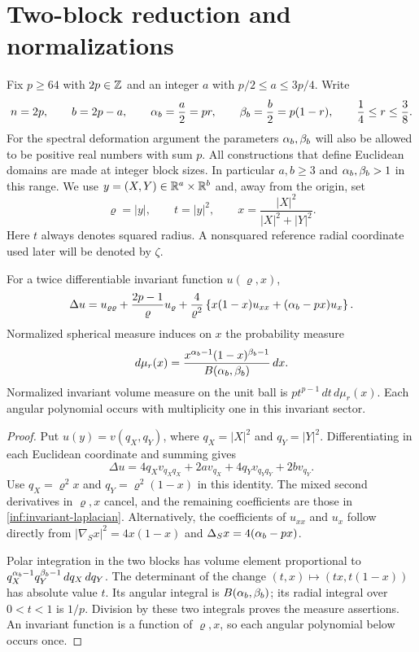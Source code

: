 \section{Two-block reduction and normalizations}\label{inf:sec-reduction}

Fix $p\ge64$ with $2p\in\mathbb{Z}$ and an integer $a$ with
$p/2\le a\le3p/4$. Write
\begin{equation}\label{inf:block-parameters}
 n=2p,\qquad b=2p-a,\qquad
 \alpha_b=\frac a2=pr,\qquad \beta_b=\frac b2=p(1-r),
 \qquad \frac14\le r\le\frac38.
\end{equation}
For the spectral deformation argument the parameters $\alpha_b,\beta_b$ will also
be allowed to be positive real numbers with sum $p$. All constructions
that define Euclidean domains are made at integer block sizes.
In particular $a,b\ge3$ and $\alpha_b,\beta_b>1$ in this range.
We use $y=(X,Y)\in\mathbb{R}^a\times\mathbb{R}^b$ and, away from the origin, set
\begin{equation}\label{inf:coordinates}
 \varrho=|y|,\qquad t=|y|^2,\qquad
 x=\frac{|X|^2}{|X|^2+|Y|^2}.
\end{equation}
Here $t$ always denotes squared radius. A nonsquared reference radial
coordinate used later will be denoted by $\zeta$.

\begin{lemma}\label{inf:reduction}
For a twice differentiable invariant function $u(\varrho,x)$,
\begin{equation}\label{inf:invariant-laplacian}
 \Delta u=u_{\varrho\varrho}+\frac{2p-1}{\varrho}u_\varrho
 +\frac4{\varrho^2}\left\{x(1-x)u_{xx}+(\alpha_b-px)u_x\right\}.
\end{equation}
Normalized spherical measure induces on $x$ the probability measure
\begin{equation}\label{inf:beta-measure}
 d\mu_r(x)=\frac{x^{\alpha_b-1}(1-x)^{\beta_b-1}}{B(\alpha_b,\beta_b)}\,dx.
\end{equation}
Normalized invariant volume measure on the unit ball is
$p t^{p-1}\,dt\,d\mu_r(x)$. Each angular polynomial occurs with
multiplicity one in this invariant sector.
\end{lemma}
\begin{proof}
Put $u(y)=v(q_X,q_Y)$, where $q_X=|X|^2$ and $q_Y=|Y|^2$.
Differentiating in each Euclidean coordinate and summing gives
\[
 \Delta u=4q_Xv_{q_Xq_X}+2av_{q_X}
          +4q_Yv_{q_Yq_Y}+2bv_{q_Y}.
\]
Use $q_X=\varrho^2x$ and $q_Y=\varrho^2(1-x)$ in this identity.
The mixed second derivatives in $\varrho,x$ cancel, and the remaining
coefficients are those in \eqref{inf:invariant-laplacian}.
Alternatively, the coefficients of $u_{xx}$ and $u_x$ follow directly
from $|\nabla_S x|^2=4x(1-x)$ and
$\Delta_S x=4(\alpha_b-px)$.

Polar integration in the two blocks has volume element proportional to
$q_X^{\alpha_b-1}q_Y^{\beta_b-1}\,dq_X\,dq_Y$. The determinant of the change
$(t,x)\mapsto(tx,t(1-x))$ has absolute value $t$. Its angular integral
is $B(\alpha_b,\beta_b)$; its radial integral over $0<t<1$ is $1/p$.
Division by these two integrals proves the measure assertions.
An invariant function is a function of $\varrho,x$, so each angular
polynomial below occurs once.
\end{proof}

